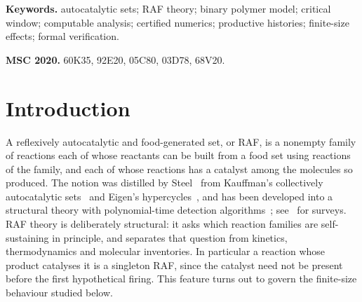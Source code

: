 \documentclass[11pt,a4paper]{article}
\theoremstyle{plain}
\theoremstyle{definition}
\theoremstyle{remark}
\begin{document}
\noindent\textbf{Keywords.} autocatalytic sets; RAF theory; binary polymer model; critical window; computable analysis; certified numerics; productive histories; finite-size effects; formal verification.

\medskip
\noindent\textbf{MSC 2020.} 60K35, 92E20, 05C80, 03D78, 68V20.

\section{Introduction}\label{sec:intro}

A reflexively autocatalytic and food-generated set, or RAF, is a nonempty family of reactions each of whose reactants can be built from a food set using reactions of the family, and each of whose reactions has a catalyst among the molecules so produced. The notion was distilled by Steel~\cite{steel2000emergence} from Kauffman's collectively autocatalytic sets~\cite{kauffman1986autocatalytic,kauffman1993origins} and Eigen's hypercycles~\cite{eigen1971selforganization}, and has been developed into a structural theory with polynomial-time detection algorithms~\cite{hordijk2004detecting,hordijk2012structure,hordijk2015algorithms,steel2019autocatalytic}; see~\cite{hordijk2010autocatalytic,hordijk2017chasing} for surveys. RAF theory is deliberately structural: it asks which reaction families are self-sustaining in principle, and separates that question from kinetics, thermodynamics and molecular inventories. In particular a reaction whose product catalyses it is a singleton RAF, since the catalyst need not be present before the first hypothetical firing. This feature turns out to govern the finite-size behaviour studied below.
\end{document}
